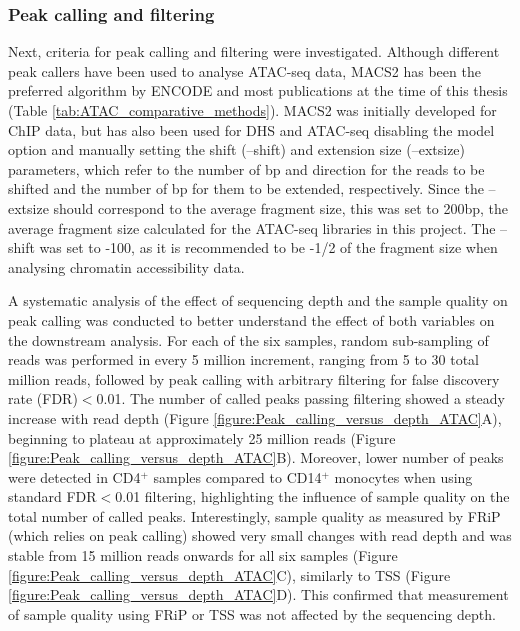 \subsubsection{Peak calling and filtering}
\label{peak_filtering}
Next, criteria for peak calling and filtering were investigated. Although different peak callers have been used to analyse ATAC-seq data, MACS2 has been the preferred algorithm by ENCODE and most publications at the time of this thesis (Table \ref{tab:ATAC_comparative_methods}). MACS2 was initially developed for ChIP data, but has also been used for DHS and ATAC-seq disabling the model option and manually setting the shift (--shift) and extension size (--extsize) parameters, which refer to the number of bp and direction for the reads to be shifted and the number of bp for them to be extended, respectively. Since the --extsize should correspond to the average fragment size, this was set to 200bp, the average fragment size calculated for the ATAC-seq libraries in this project. The --shift was set to -100, as it is recommended to be -1/2 of the fragment size when analysing chromatin accessibility data. 

A systematic analysis of the effect of sequencing depth and the sample quality on peak calling was conducted to better understand the effect of both variables on the downstream analysis. For each of the six samples, random sub-sampling of reads was performed in every 5 million increment, ranging from 5 to 30 total million reads, followed by peak calling with arbitrary filtering for false discovery rate (FDR)$<$0.01. The number of called peaks passing filtering showed a steady increase with read depth  (Figure \ref{figure:Peak_calling_versus_depth_ATAC}A), beginning to plateau at approximately 25 million reads (Figure \ref{figure:Peak_calling_versus_depth_ATAC}B). Moreover, lower number of peaks were detected in CD4$^+$ samples compared to CD14$^+$ monocytes when using standard  FDR$<$0.01 filtering, highlighting the influence of sample quality on the total number of called peaks. Interestingly, sample quality as measured by FRiP (which relies on peak calling) showed very small changes with read depth and was stable from 15 million reads onwards for all six samples (Figure \ref{figure:Peak_calling_versus_depth_ATAC}C), similarly to TSS (Figure \ref{figure:Peak_calling_versus_depth_ATAC}D). This confirmed that measurement of sample quality using FRiP or TSS was not affected by the sequencing depth.

